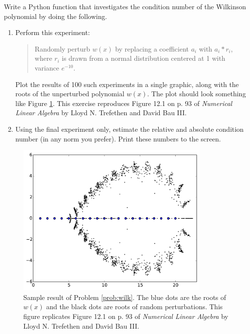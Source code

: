 \begin{problem}\label{prob:wilk}
Write a Python function that investigates the condition number of the Wilkinson polynomial by doing the following.
\begin{enumerate}
\item Perform this experiment:

\begin{quote}
Randomly perturb $w(x)$ by replacing a coefficient $a_i$ with $a_i*r_i$, where $r_i$ is drawn from a normal distribution centered at 1 with variance $e^{-10}$.
\end{quote}

Plot the results of 100 such experiments in a single graphic, along with the roots of the unperturbed polynomial $w(x)$. The plot should look something like Figure \ref{fig:wilkinsonpolynomial_many}. This exercise reproduces Figure 12.1 on p. 93 of \emph{Numerical Linear Algebra} by Lloyd N. Trefethen and David Bau III.
\item Using the final experiment only, estimate the relative and absolute condition number (in any norm you prefer). Print these numbers to the screen.
\end{enumerate}
\begin{figure}[H]
\includegraphics[height=3in]{wilkinsonpolynomial_many.pdf}
\caption{Sample result of Problem \ref{prob:wilk}.
The blue dots are the roots of $w(x)$ and the black dots are roots of random perturbations. 
This figure replicates Figure 12.1 on p. 93 of \emph{Numerical Linear Algebra} by Lloyd N. Trefethen and David Bau III.}
\label{fig:wilkinsonpolynomial_many}
\end{figure}

\end{problem}



